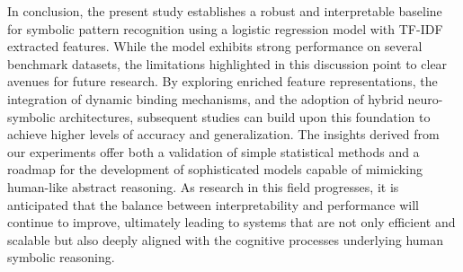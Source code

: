 \documentclass{article}
\begin{document}
In conclusion, the present study establishes a robust and interpretable baseline for symbolic pattern recognition using a logistic regression model with TF-IDF extracted features. While the model exhibits strong performance on several benchmark datasets, the limitations highlighted in this discussion point to clear avenues for future research. By exploring enriched feature representations, the integration of dynamic binding mechanisms, and the adoption of hybrid neuro-symbolic architectures, subsequent studies can build upon this foundation to achieve higher levels of accuracy and generalization. The insights derived from our experiments offer both a validation of simple statistical methods and a roadmap for the development of sophisticated models capable of mimicking human-like abstract reasoning. As research in this field progresses, it is anticipated that the balance between interpretability and performance will continue to improve, ultimately leading to systems that are not only efficient and scalable but also deeply aligned with the cognitive processes underlying human symbolic reasoning.
\end{document}
